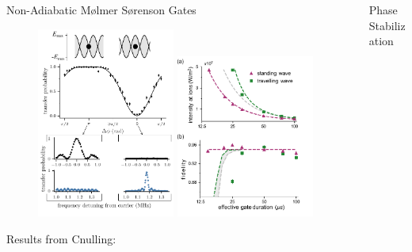 \documentclass[final]{beamer}
\begin{document}
\begin{frame}{}
\begin{center}
\begin{columns}[t]
\begin{column}{0.49\textwidth}
\begin{alertblock}{Non-Adiabatic Mølmer Sørenson Gates}
      \begin{figure}
        \includegraphics[width=0.48\textwidth]{./figs/Figure_2_v2.pdf}
        \includegraphics[width=0.48\textwidth]{./figs/two_qubit_gate_figure.pdf}
      \end{figure}

      Results from Cnulling:

    \end{alertblock}

  \end{column}
  \begin{column}{0.49\textwidth}


    \begin{alertblock}{Phase Stabilization}


\end{alertblock}
\end{column}
\end{columns}
\end{center}
\end{frame}
\end{document}
